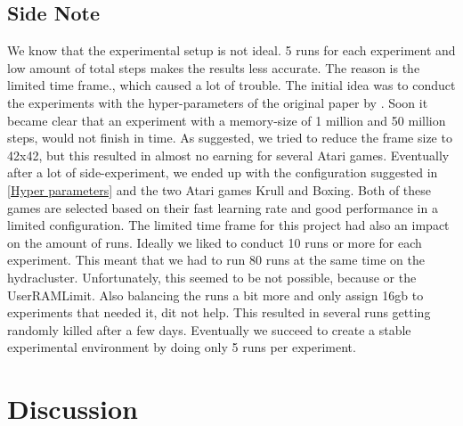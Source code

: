\documentclass{sig-alternate}
\begin{document}
\subsection{Side Note}

We know that the experimental setup is not ideal. 5 runs for each experiment and low amount of total steps makes the results less accurate. The reason is the limited time frame., which caused a lot of trouble. The initial idea was to conduct the experiments with the hyper-parameters of the original paper by \cite{mnih2015human}. Soon it became clear that an experiment with a memory-size of 1 million and 50 million steps, would not finish in time. As suggested, we tried to reduce the frame size to 42x42, but this resulted in almost no earning for several Atari games. Eventually after a lot of side-experiment, we ended up with the configuration suggested in \ref{Hyper parameters} and the two Atari games Krull and Boxing. Both of these games are selected based on their fast learning rate and good performance in a limited configuration. The limited time frame for this project had also an impact on the amount of runs. Ideally we liked to conduct 10 runs or more for each experiment. This meant that we had to run 80 runs at the same time on the hydracluster. Unfortunately, this seemed to be not possible, because or the UserRAMLimit. Also balancing the runs a bit more and only assign 16gb to experiments that needed it, dit not help. This resulted in several runs getting randomly killed after a few days. Eventually we succeed to create a stable experimental environment by doing only 5 runs per experiment. 

\section{Discussion}


%

%
%
\end{document}
